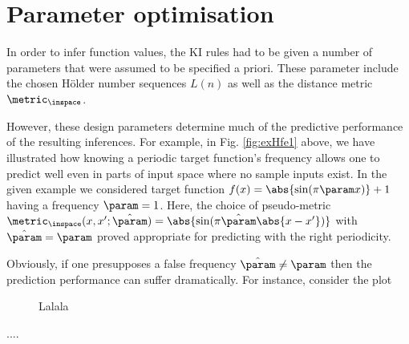 \section{Parameter optimisation}
In order to infer function values, the KI rules had to be given a number of parameters that were assumed to be specified a priori. These parameter include the chosen H\"older number sequences $L(n)$ as well as the distance metric $\metric_\inspace$.

However, these design parameters determine much of the predictive performance of the resulting inferences. For example, in Fig. \ref{fig:exHfe1} above, we have illustrated how knowing a periodic target function's frequency allows one to predict well even in parts of input space where no sample inputs exist. 
In the given example we considered target function $f(x)= \abs{\sin(\pi \param x)} +1$ having a frequency $\param =1$. Here, the choice of pseudo-metric $\metric_\inspace(x,x';\hat \param) = \abs{\sin(\pi \hat \param \abs{x-x'})} $ with $\hat \param= \param$ proved appropriate for predicting with the right periodicity.

Obviously, if one presupposes a false frequency $\hat \param \neq \param$ then the prediction performance can suffer dramatically. For instance, consider the plot 

\begin{figure}
        \centering
   \caption{Lalala }
			\label{fig:metricparopt}
\end{figure}	 

....


